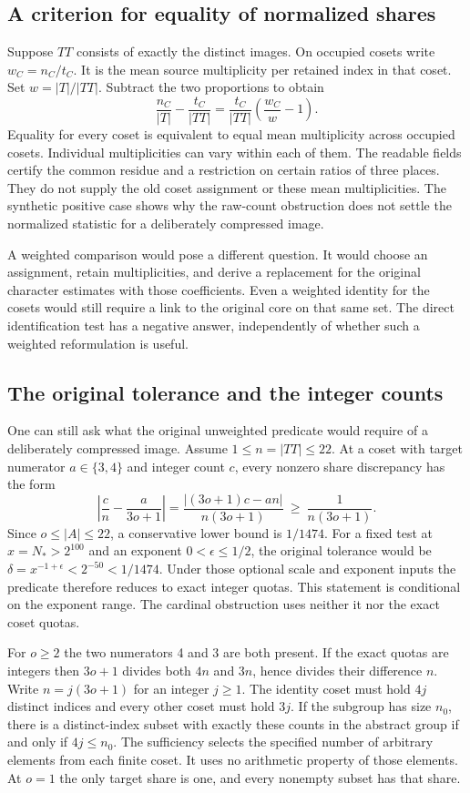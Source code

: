 \documentclass[12pt,letterpaper]{article}
\begin{document}
\subsection{A criterion for equality of normalized shares}
Suppose $TT$ consists of exactly the distinct images. On occupied cosets write $w_C=n_C/t_C$. It is the mean source multiplicity per retained index in that coset. Set $w=|T|/|TT|$. Subtract the two proportions to obtain
\[
      \frac{n_C}{|T|}-\frac{t_C}{|TT|}
          = \frac{t_C}{|TT|}\left(\frac{w_C}{w}-1\right).
\]
Equality for every coset is equivalent to equal mean multiplicity across occupied cosets. Individual multiplicities can vary within each of them. The readable fields certify the common residue and a restriction on certain ratios of three places. They do not supply the old coset assignment or these mean multiplicities. The synthetic positive case shows why the raw-count obstruction does not settle the normalized statistic for a deliberately compressed image.

A weighted comparison would pose a different question. It would choose an assignment, retain multiplicities, and derive a replacement for the original character estimates with those coefficients. Even a weighted identity for the cosets would still require a link to the original core on that same set. The direct identification test has a negative answer, independently of whether such a weighted reformulation is useful.

\subsection{The original tolerance and the integer counts}
One can still ask what the original unweighted predicate would require of a deliberately compressed image. Assume $1\le n=|TT|\le22$. At a coset with target numerator $a\in\{3,4\}$ and integer count $c$, every nonzero share discrepancy has the form
\[
 \left|\frac cn-\frac{a}{3o+1}\right|
 =\frac{|(3o+1)c-an|}{n(3o+1)}
 \ \ge\ \frac{1}{n(3o+1)}.
\]
Since $o\le |A|\le22$, a conservative lower bound is $1/1474$. For a fixed test at $x=N_*>2^{100}$ and an exponent $0<\epsilon\le1/2$, the original tolerance would be $\delta=x^{-1+\epsilon}<2^{-50}<1/1474$. Under those optional scale and exponent inputs the predicate therefore reduces to exact integer quotas. This statement is conditional on the exponent range. The cardinal obstruction uses neither it nor the exact coset quotas.

For $o\ge2$ the two numerators 4 and 3 are both present. If the exact quotas are integers then $3o+1$ divides both $4n$ and $3n$, hence divides their difference $n$. Write $n=j(3o+1)$ for an integer $j\ge1$. The identity coset must hold $4j$ distinct indices and every other coset must hold $3j$. If the subgroup has size $n_0$, there is a distinct-index subset with exactly these counts in the abstract group if and only if $4j\le n_0$. The sufficiency selects the specified number of arbitrary elements from each finite coset. It uses no arithmetic property of those elements. At $o=1$ the only target share is one, and every nonempty subset has that share.
\end{document}
